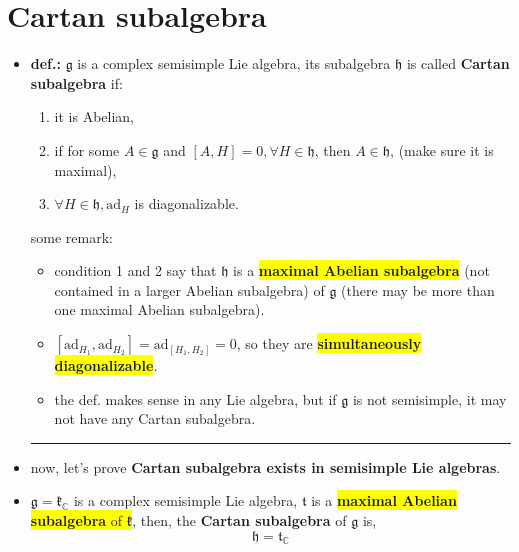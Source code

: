 \section{Cartan subalgebra} \label{6.2}
\begin{itemize}
	\item \textbf{def.:} $\mathfrak{g}$ is a complex semisimple Lie algebra, its subalgebra $\mathfrak{h}$ is called \textbf{Cartan subalgebra} if:
	\begin{enumerate}
		\item it is Abelian,
		
		\item if for some $A \in \mathfrak{g}$ and $[A, H] = 0, \forall H \in \mathfrak{h}$, then $A \in \mathfrak{h}$, (make sure it is maximal),
		
		\item $\forall H \in \mathfrak{h}, \mathrm{ad}_H$ is diagonalizable.
	\end{enumerate}
	some remark:
	\begin{itemize}
		\item condition 1 and 2 say that $\mathfrak{h}$ is a \colorbox{yellow}{\textbf{maximal Abelian subalgebra}} (not contained in a larger Abelian subalgebra) of $\mathfrak{g}$ (there may be more than one maximal Abelian subalgebra).
		
		\item $[\mathrm{ad}_{H_1}, \mathrm{ad}_{H_2}] = \mathrm{ad}_{[H_1, H_2]} = 0$, so they are \colorbox{yellow}{\textbf{simultaneously diagonalizable}}.
		
		\item the def. makes sense in any Lie algebra, but if $\mathfrak{g}$ is not semisimple, it may not have any Cartan subalgebra.
	\end{itemize}
	
	\noindent\rule[0.5ex]{\linewidth}{0.5pt} %
	
	\item now, let's prove \textbf{Cartan subalgebra exists in semisimple Lie algebras}.
	
	\item $\mathfrak{g} = \mathfrak{k}_\mathbb{C}$ is a complex semisimple Lie algebra, $\mathfrak{t}$ is a \colorbox{yellow}{\textbf{maximal Abelian subalgebra} of $\mathfrak{k}$}, then, the \textbf{Cartan subalgebra} of $\mathfrak{g}$ is,
	\begin{equation} \label{6.2.1}
		\mathfrak{h} = \mathfrak{t}_\mathbb{C}
	\end{equation}
	

\end{itemize}
